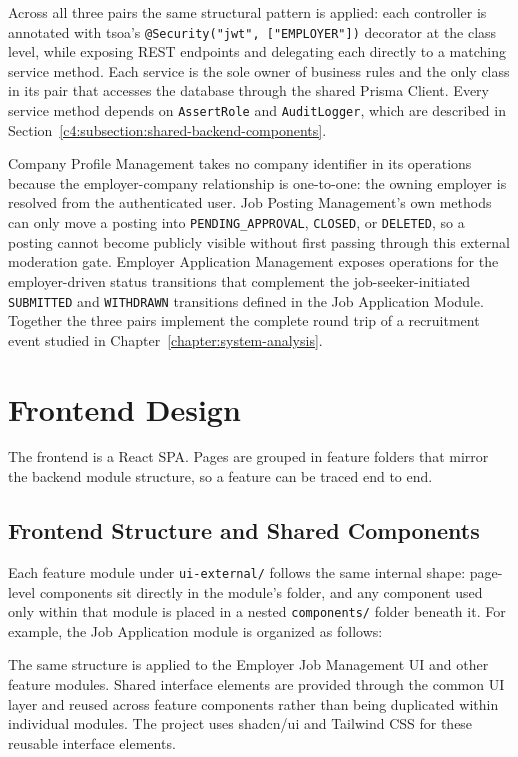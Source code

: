 Across all three pairs the same structural pattern is applied: each controller is annotated with tsoa's \texttt{@Security("jwt", ["EMPLOYER"])} decorator at the class level, while exposing REST endpoints and delegating each directly to a matching service method. Each service is the sole owner of business rules and the only class in its pair that accesses the database through the shared Prisma Client. Every service method depends on \texttt{AssertRole} and \texttt{AuditLogger}, which are described in Section~\ref{c4:subsection:shared-backend-components}.

Company Profile Management takes no company identifier in its operations because the employer-company relationship is one-to-one: the owning employer is resolved from the authenticated user. Job Posting Management's own methods can only move a posting into \texttt{PENDING\_APPROVAL}, \texttt{CLOSED}, or \texttt{DELETED}, so a posting cannot become publicly visible without first passing through this external moderation gate. Employer Application Management exposes operations for the employer-driven status transitions that complement the job-seeker-initiated \texttt{SUBMITTED} and \texttt{WITHDRAWN} transitions defined in the Job Application Module. Together the three pairs implement the complete round trip of a recruitment event studied in Chapter~\ref{chapter:system-analysis}.


\section{Frontend Design}
\label{c4:section:frontend-design}

The frontend is a React SPA. Pages are grouped in feature folders that mirror the backend module structure, so a feature can be traced end to end.

\subsection{Frontend Structure and Shared Components}
\label{c4:subsection:frontend-structure}

Each feature module under \texttt{ui-external/} follows the same internal shape: page-level components sit directly in the module's folder, and any component used only within that module is placed in a nested \texttt{components/} folder beneath it. For example, the Job Application module is organized as follows:

The same structure is applied to the Employer Job Management UI and other feature modules. Shared interface elements are provided through the common UI layer and reused across feature components rather than being duplicated within individual modules. The project uses shadcn/ui \cite{shadcn_docs} and Tailwind CSS \cite{tailwind_docs} for these reusable interface elements.


